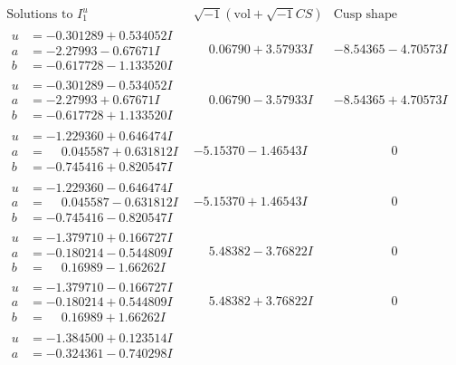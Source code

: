 \documentclass[1p]{elsarticle_modified}
\theoremstyle{definition}
\newcommand{\I}{\sqrt{-1}}
\begin{document}
$$\begin{array}{c|c|c}
\text{Solutions to }I^u_{1}& \I (\text{vol} + \sqrt{-1}CS) & \text{Cusp shape}\\
 \hline 
\begin{aligned}
u &= -0.301289 + 0.534052 I \\
a &= -2.27993 - 0.67671 I \\
b &= -0.617728 - 1.133520 I\end{aligned}
 & \phantom{-}0.06790 + 3.57933 I & -8.54365 - 4.70573 I \\ \hline\begin{aligned}
u &= -0.301289 - 0.534052 I \\
a &= -2.27993 + 0.67671 I \\
b &= -0.617728 + 1.133520 I\end{aligned}
 & \phantom{-}0.06790 - 3.57933 I & -8.54365 + 4.70573 I \\ \hline\begin{aligned}
u &= -1.229360 + 0.646474 I \\
a &= \phantom{-}0.045587 + 0.631812 I \\
b &= -0.745416 + 0.820547 I\end{aligned}
 & -5.15370 - 1.46543 I & \phantom{-0.000000 } 0 \\ \hline\begin{aligned}
u &= -1.229360 - 0.646474 I \\
a &= \phantom{-}0.045587 - 0.631812 I \\
b &= -0.745416 - 0.820547 I\end{aligned}
 & -5.15370 + 1.46543 I & \phantom{-0.000000 } 0 \\ \hline\begin{aligned}
u &= -1.379710 + 0.166727 I \\
a &= -0.180214 - 0.544809 I \\
b &= \phantom{-}0.16989 - 1.66262 I\end{aligned}
 & \phantom{-}5.48382 - 3.76822 I & \phantom{-0.000000 } 0 \\ \hline\begin{aligned}
u &= -1.379710 - 0.166727 I \\
a &= -0.180214 + 0.544809 I \\
b &= \phantom{-}0.16989 + 1.66262 I\end{aligned}
 & \phantom{-}5.48382 + 3.76822 I & \phantom{-0.000000 } 0 \\ \hline\begin{aligned}
u &= -1.384500 + 0.123514 I \\
a &= -0.324361 - 0.740298 I \\

\end{aligned}
\end{array}$$
\end{document}
